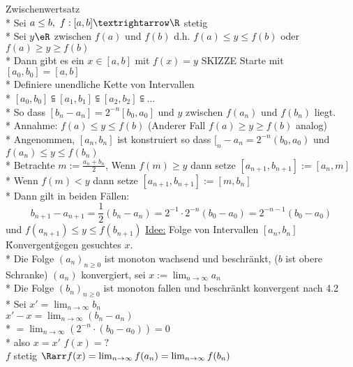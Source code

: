 %
\wdh
Zwischenwertsatz\\*
Sei $a\leq b,\ f:[a,b]→\R$ stetig\\*
Sei $y\eR$ zwischen $f(a)$ und $f(b)$ d.h. $f(a)\leq y\leq f(b)$ oder $f(a)\geq y\geq f(b)$\\*
Dann gibt es ein $x\in[a,b]$ mit $f(x)=y$ SKIZZE
Starte mit $[a_0,b_0]=[a,b]$\\*
Definiere unendliche Kette von Intervallen\\*
$[a_0,b_0]\subseteqq [a_1,b_1]\subseteqq [a_2,b_2]\subseteqq …$\\*
So dass $[b_n-a_n]=2^{-n}[b_0,a_0]$ und $y$ zwischen $f(a_n)$ und $f(b_n)$ liegt.\\*
Annahme: $f(a)\leq y\leq f(b)$ (Anderer Fall $f(a)\geq y\geq f(b)$ analog)\\*
Angenommen, $[a_n,b_n]$ ist konstruiert so dass $[_n-a_n=2^{-n}(b_0,a_0)$ und $f(a_n)\leq y\leq f(b_n)$\\*
Betrachte $m:=\frac{a_n+b_n}{2}$, Wenn $f(m)\geq y$ dann setze $[a_{n+1},b_{n+1}]:=[a_n,m]$\\*
Wenn $f(m)<y$ dann setze $[a_{n+1},b_{n+1}]:=[m,b_n]$\\*
Dann gilt in beiden Fällen:
$$b_{n+1}-a_{n+1}=\frac{1}{2}(b_n-a_n)=2^{-1}·2^{-n}(b_0-a_0)=2^{-n-1}(b_0-a_0)$$
und $f(a_{n+1})\leq y\leq f(b_{n+1})$
%
\ul{Idee:} Folge von Intervallen $[a_n, b_n]$ \"Konvergent\" gegen gesuchtes $x$.\\*
	Die Folge $(a_n)_{n \geq 0}$ ist monoton wachsend und beschränkt, ($b$ ist obere Schranke) \Rarr $(a_n)$ konvergiert, sei $x:=\lim_{n \to \infty} a_n$\\*
	Die Folge $(b_n)_{n \geq 0}$ ist monoton fallen und beschränkt \Rarr konvergent nach 4.2\\*
	Sei $x' = \lim_{n \to \infty} b_n$\\
	$x' - x = \lim_{n \to \infty} (b_n - a_n)$\\*
	$= \lim_{n \to \infty} (2^{-n} \cdot (b_0 - a_0)) = 0$\\*
	also $x = x'$ $f(x) = ?$\\
	$f$ stetig $\Rarr f(x) = \lim_{n \to \infty} f(a_n) = \lim_{n \to \infty} f(b_n)$\\
